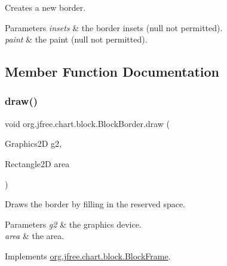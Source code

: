 Creates a new border.


\begin{DoxyParams}{Parameters}
{\em insets} & the border insets ({\ttfamily null} not permitted). \\
\hline
{\em paint} & the paint ({\ttfamily null} not permitted). \\
\hline
\end{DoxyParams}


\subsection{Member Function Documentation}
\mbox{\label{classorg_1_1jfree_1_1chart_1_1block_1_1_block_border_af76639888de7329092e0432ad264ada6}} 
\subsubsection{\texorpdfstring{draw()}{draw()}}
{\footnotesize\ttfamily void org.\+jfree.\+chart.\+block.\+Block\+Border.\+draw (\begin{DoxyParamCaption}\item[{Graphics2D}]{g2,  }\item[{Rectangle2D}]{area }\end{DoxyParamCaption})}

Draws the border by filling in the reserved space.


\begin{DoxyParams}{Parameters}
{\em g2} & the graphics device. \\
\hline
{\em area} & the area. \\
\hline
\end{DoxyParams}


Implements \mbox{\hyperlink{interfaceorg_1_1jfree_1_1chart_1_1block_1_1_block_frame_abd9e0bc4603225750c908ddbcfbb088e}{org.\+jfree.\+chart.\+block.\+Block\+Frame}}.

\mbox{\label{classorg_1_1jfree_1_1chart_1_1block_1_1_block_border_a9009dd671a133d1172fe283d7f79da7d}} 
